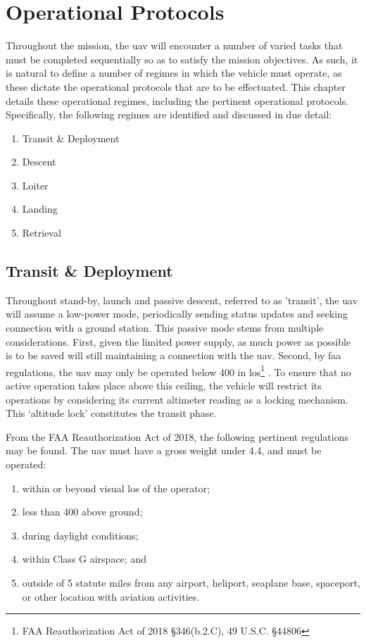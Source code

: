 \chapter{Operational Protocols}

Throughout the mission, the \gls{uav} will encounter a number of varied tasks that must be completed sequentially so as to satisfy the mission objectives. As such, it is natural to define a number of regimes in which the vehicle must operate, as these dictate the operational protocols that are to be effectuated. This chapter details these operational regimes, including the pertinent operational protocols. Specifically, the following regimes are identified and discussed in due detail:

\begin{enumerate}[noitemsep, label=\Roman*.]
	\item Transit \& Deployment
	\item Descent
	\item Loiter
	\item Landing
	\item Retrieval
\end{enumerate}

\section{Transit \& Deployment}

Throughout stand-by, launch and passive descent, referred to as 'transit', the \gls{uav} will assume a low-power mode, periodically sending status updates and seeking connection with a ground station. This passive mode stems from multiple considerations. First, given the limited power supply, as much power as possible is to be saved will still maintaining a connection with the \gls{uav}. Second, by \gls{faa} regulations, the \gls{uav} may only be operated below \SI{400}{\feet} in \gls{los}\footnote{FAA Reauthorization Act of 2018 \S 346(b.2.C), 49 U.S.C. \S 44806} \citep{FederalAviationAdministration2018}. To ensure that no active operation takes place above this ceiling, the vehicle will restrict its operations by considering its current altimeter reading as a locking mechanism. This `altitude lock' constitutes the transit phase.

From the FAA Reauthorization Act of 2018, the following pertinent regulations may be found. The \gls{uav} must have a gross weight under \SI{4.4}{\poundm}, and must be operated:

\begin{enumerate}[noitemsep, label=(\roman*)]
	\item within or beyond visual \gls{los} of the operator;
	\item less than \SI{400}{\feet} above ground;
	\item during daylight conditions;
	\item within Class G airspace; and
	\item outside of 5 statute miles from any airport, heliport, seaplane base, spaceport, or other location with aviation activities.
\end{enumerate}


